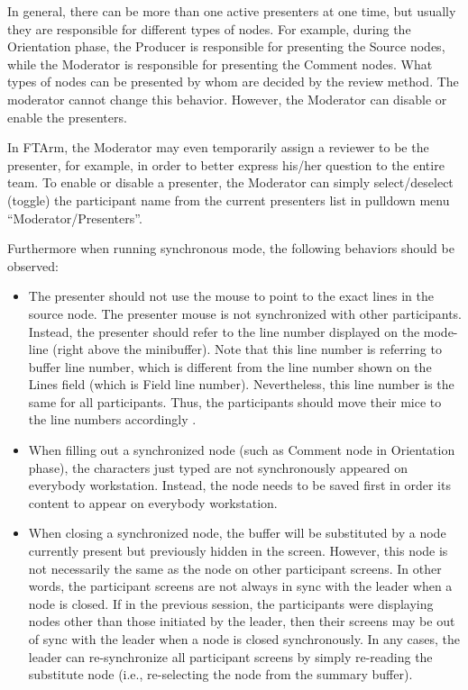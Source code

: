 In general, there can be more than one active presenters at one 
time, but usually they are responsible for different types of nodes.
For example, during the Orientation phase, the Producer is responsible for
presenting the Source nodes, while the Moderator is responsible for
presenting the Comment nodes.
What types of nodes can be presented by whom are decided by the review
method. The moderator cannot change this behavior. However, the
Moderator can disable or enable the presenters.

In FTArm, the Moderator may even temporarily assign a reviewer to
be the presenter, for example, in order to better express his/her
question to the entire team.
To enable or disable a presenter, the Moderator can simply
select/deselect (toggle) the participant name from the current
presenters list in pulldown menu ``Moderator/Presenters''.

\noindent Furthermore when running synchronous mode, the following behaviors
should be observed:
\begin{itemize}
\item The presenter should not use the mouse to point to the exact
lines in the source node. The presenter mouse is not synchronized with
other participants.
Instead, the presenter should refer to the line number displayed
on the mode-line (right above the minibuffer). Note that this line
number is referring to buffer line number, which is different from the
line number shown on the Lines field (which is Field line number).
Nevertheless, this line number is the same for all participants.
Thus, the participants should move their mice to the line numbers
accordingly .


\item When filling out a synchronized node (such as Comment
node in Orientation phase), the characters just typed are not
synchronously appeared on everybody workstation. Instead, the node
needs to be saved first in order its content to appear on everybody
workstation. 

\item When closing a synchronized node, the buffer will be substituted
by a node currently present but previously hidden in the
screen. However, this node is not necessarily the same as the node
on other participant screens. In other words, the participant screens
are not always in sync with the leader when a node is closed.
If in the previous session,
the participants were displaying nodes other than those initiated by
the leader, then their screens may be out of sync with the leader when
a node is closed synchronously.
In any cases, the leader can re-synchronize all participant screens by
simply re-reading the substitute node (i.e., re-selecting the node from
the summary buffer). 
\end{itemize}





